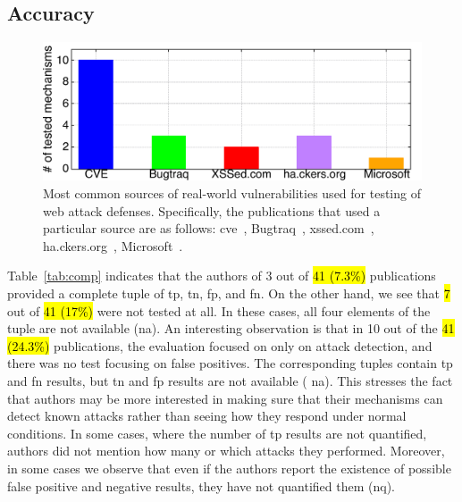 \documentclass[10pt,journal,compsoc]{IEEEtran}
\newcommand{\hlc}[2][yellow]{ {\sethlcolor{#1} \hl{#2}} }
\begin{document}
\subsection{Accuracy}

\begin{figure}[t]
\begin{center}
\leavevmode
\includegraphics[scale=0.40]{barchart.pdf}
\end{center}
\vspace{-5.7mm}
\caption{\label{fig:defect_sources}Most common sources of real-world vulnerabilities
used for testing of web attack defenses.
Specifically, the publications that used a particular source are as follows:
{\sc cve}~\cite{XBS06,NLC07,PMP11,BK04,BV08,JB07,SMS13,WPLKK09,JKK06a,PS11},
Bugtraq~\cite{PB05,KJKV09,JEP08},
{\sc xss}ed.com~\cite{NSS06,APKLM10},
ha.ckers.org~\cite{TNH07,PSC09,LV09},
Microsoft~\cite{RDWDE07}.}
\vspace{-6.3mm}
\end{figure}

Table~\ref{tab:comp} indicates that the authors of 3 out of \hlc[yellow]{41 (7.3\%)}
publications provided a complete tuple of {\sc tp}, {\sc tn}, 
{\sc fp}, and {\sc fn}. On the other hand, we
see that \hlc[yellow]{7} out of \hlc[yellow]{41 (17\%)} were not tested at all.
In these cases, all four elements of the tuple
are not available ({\sc na}). An interesting observation is
that in 10 out of the \hlc[yellow]{41 (24.3\%)}
publications, the evaluation focused on only on attack detection,
and there was no test focusing on false positives.
The corresponding tuples contain {\sc tp} and {\sc fn}
results, but {\sc tn} and {\sc fp} results are not available ({\sc
  na}). This stresses the fact that authors may be more interested in
making sure that their mechanisms can detect known attacks rather than
seeing how they respond under normal conditions. In some cases,
where the number of {\sc tp} results are not quantified, authors did
not mention how many or which attacks they performed. Moreover, in some
cases we observe that even if the authors report the existence of
possible false positive and negative results, they have not quantified
them ({\sc nq}).
\end{document}
